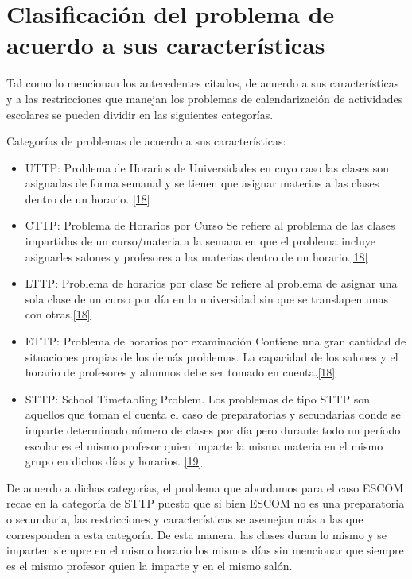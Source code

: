 \label{sec:marcoTeo}
	
	\section{Clasificación del problema de acuerdo a sus características}
	Tal como lo mencionan los antecedentes citados, de acuerdo a sus características y a las restricciones que manejan los problemas de calendarización de actividades escolares se pueden dividir en las siguientes categorías.
	
		Categorías de problemas de acuerdo a sus características:
	
	\begin{itemize}
		\item UTTP: Problema de Horarios de Universidades
		en cuyo caso las clases son asignadas de forma semanal y se tienen que asignar materias a las clases dentro de un horario. \ref{18}
		
		\item CTTP: Problema de Horarios por Curso
		Se refiere al problema de las clases impartidas de un curso/materia a la semana en que el problema incluye asignarles salones y profesores a las materias dentro de un horario.\ref{18}
		
		\item LTTP: Problema de horarios por clase
		Se refiere al problema de asignar una sola clase de un curso por día en la universidad sin que se translapen unas con otras.\ref{18}
		
		\item ETTP: Problema de horarios por examinación
		Contiene una gran cantidad de situaciones propias de los demás problemas. La capacidad de los salones y el horario de profesores y alumnos debe ser tomado en cuenta.\ref{18}
		
		\item STTP: School Timetabling Problem. Los problemas de tipo STTP son aquellos que toman el cuenta el caso de preparatorias y secundarias donde se imparte determinado número de clases por día pero durante todo un período escolar es el mismo profesor quien imparte la misma materia en el mismo grupo en dichos días y horarios.  \ref{19}
	\end{itemize}

	De acuerdo a dichas categorías, el problema que abordamos para el caso ESCOM recae en la categoría de STTP puesto que si bien ESCOM no es una preparatoria o secundaria, las restricciones y características se asemejan más a las que corresponden a esta categoría. De esta manera, las clases duran lo mismo y se imparten siempre en el mismo horario los mismos días sin mencionar que siempre es el mismo profesor quien la imparte y en el mismo salón.
	
